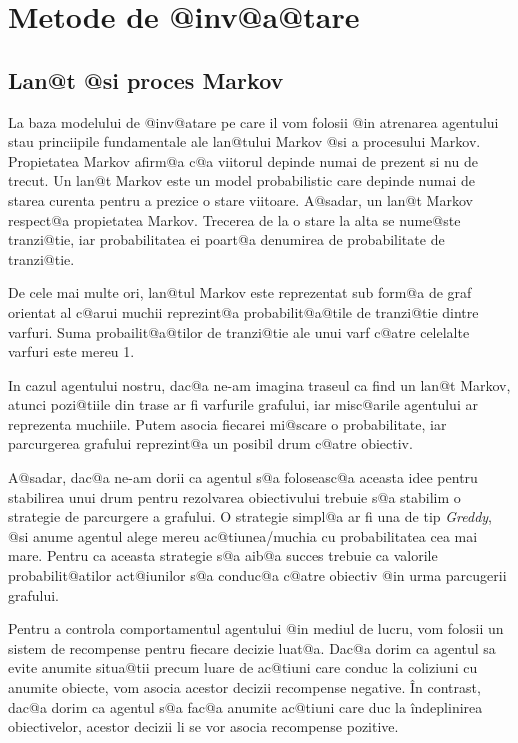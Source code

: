 \chapter{Metode de @inv@a@tare}

\section{Lan@t @si proces Markov}


La baza modelului de @inv@atare pe care il vom folosii @in atrenarea agentului stau princiipile fundamentale ale lan@tului Markov @si a procesului Markov.
Propietatea Markov afirm@a c@a viitorul depinde numai de prezent si nu de trecut. Un lan@t Markov este un model probabilistic care depinde numai de starea curenta pentru a prezice o stare viitoare. A@sadar, un lan@t Markov respect@a propietatea Markov.
Trecerea de la o stare la alta se nume@ste tranzi@tie, iar probabilitatea ei poart@a denumirea de probabilitate de tranzi@tie.

De cele mai multe ori, lan@tul Markov este reprezentat sub form@a de graf orientat al c@arui muchii reprezint@a probabilit@a@tile de tranzi@tie dintre varfuri. Suma probailit@a@tilor de tranzi@tie ale unui varf c@atre celelalte varfuri este mereu 1.

In cazul agentului nostru, dac@a ne-am imagina traseul ca find un lan@t Markov, atunci pozi@tiile din trase ar fi varfurile grafului, iar misc@arile agentului ar reprezenta muchiile. Putem asocia fiecarei mi@scare o probabilitate, iar parcurgerea grafului reprezint@a un posibil drum c@atre obiectiv.

A@sadar, dac@a ne-am dorii ca agentul s@a foloseasc@a aceasta idee pentru stabilirea unui drum pentru rezolvarea obiectivului trebuie s@a stabilim o strategie de parcurgere a grafului.
O strategie simpl@a ar fi una de tip {\sl Greddy}, @si anume agentul alege mereu ac@tiunea/muchia cu probabilitatea cea mai mare. Pentru ca aceasta strategie s@a aib@a succes trebuie ca valorile probabilit@atilor act@iunilor s@a conduc@a c@atre obiectiv @in urma parcugerii grafului.

Pentru a controla comportamentul agentului @in mediul de lucru, vom folosii un sistem de recompense pentru fiecare decizie luat@a. Dac@a dorim ca agentul sa evite anumite situa@tii precum luare de ac@tiuni care conduc la coliziuni cu anumite obiecte, vom asocia acestor decizii recompense negative. \^In contrast, dac@a dorim ca agentul s@a fac@a anumite ac@tiuni care duc la \^indeplinirea obiectivelor, acestor decizii li se vor asocia recompense pozitive.

